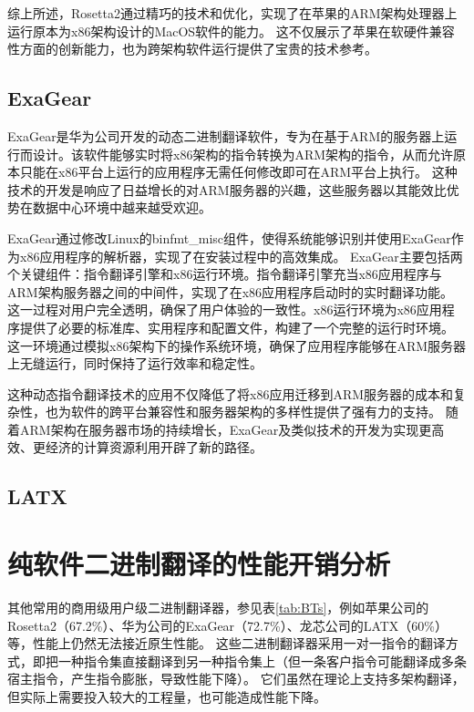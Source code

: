 综上所述，Rosetta2通过精巧的技术和优化，实现了在苹果的ARM架构处理器上运行原本为x86架构设计的MacOS软件的能力。
这不仅展示了苹果在软硬件兼容性方面的创新能力，也为跨架构软件运行提供了宝贵的技术参考。

\subsection{ExaGear}

ExaGear是华为公司开发的动态二进制翻译软件，专为在基于ARM的服务器上运行而设计。该软件能够实时将x86架构的指令转换为ARM架构的指令，从而允许原本只能在x86平台上运行的应用程序无需任何修改即可在ARM平台上执行。
这种技术的开发是响应了日益增长的对ARM服务器的兴趣，这些服务器以其能效比优势在数据中心环境中越来越受欢迎。

ExaGear通过修改Linux的binfmt\_misc组件，使得系统能够识别并使用ExaGear作为x86应用程序的解析器，实现了在安装过程中的高效集成。
ExaGear主要包括两个关键组件：指令翻译引擎和x86运行环境。指令翻译引擎充当x86应用程序与ARM架构服务器之间的中间件，实现了在x86应用程序启动时的实时翻译功能。
这一过程对用户完全透明，确保了用户体验的一致性。x86运行环境为x86应用程序提供了必要的标准库、实用程序和配置文件，构建了一个完整的运行时环境。
这一环境通过模拟x86架构下的操作系统环境，确保了应用程序能够在ARM服务器上无缝运行，同时保持了运行效率和稳定性。

这种动态指令翻译技术的应用不仅降低了将x86应用迁移到ARM服务器的成本和复杂性，也为软件的跨平台兼容性和服务器架构的多样性提供了强有力的支持。
随着ARM架构在服务器市场的持续增长，ExaGear及类似技术的开发为实现更高效、更经济的计算资源利用开辟了新的路径。


\subsection{LATX}



\section{纯软件二进制翻译的性能开销分析}

其他常用的商用级用户级二进制翻译器，参见表\ref{tab:BTs}，例如苹果公司的Rosetta2（67.2\%）、华为公司的ExaGear（72.7\%）、龙芯公司的LATX（60\%）等，性能上仍然无法接近原生性能。
这些二进制翻译器采用一对一指令的翻译方式，即把一种指令集直接翻译到另一种指令集上（但一条客户指令可能翻译成多条宿主指令，产生指令膨胀，导致性能下降）。
它们虽然在理论上支持多架构翻译，但实际上需要投入较大的工程量，也可能造成性能下降。

